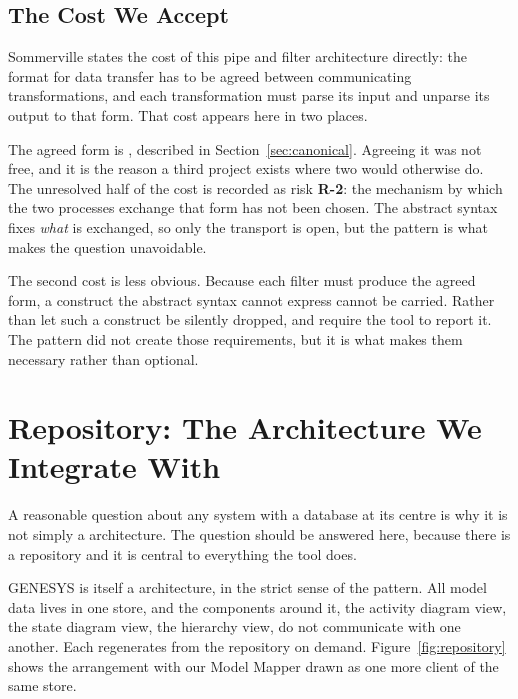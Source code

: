 \subsection{The Cost We Accept}

Sommerville states the cost of this pipe and filter architecture directly: the format for data
transfer has to be agreed between communicating transformations, and each
transformation must parse its input and unparse its output to that form. That
cost appears here in two places.

The agreed form is , described in
Section~\ref{sec:canonical}. Agreeing it was not free, and it is the reason a
third project exists where two would otherwise do. The unresolved half of the
cost is recorded as risk \textbf{R-2}: the mechanism by which the two processes
exchange that form has not been chosen. The abstract syntax fixes \emph{what} is
exchanged, so only the transport is open, but the pattern is what makes the
question unavoidable.

The second cost is less obvious. Because each filter must produce the agreed
form, a construct the abstract syntax cannot express cannot be carried. Rather
than let such a construct be silently dropped,  and  require
the tool to report it. The pattern did not create those requirements, but it is
what makes them necessary rather than optional.

\section{Repository: The Architecture We Integrate With}
\label{sec:repository}


A reasonable question about any system with a database at its centre is why it is not
simply a  architecture. The question should be answered
here, because there is a repository and it is central to everything the tool
does.

GENESYS is itself a  architecture, in the strict sense of
the pattern. All model data lives in one store, and the components around it,
the activity diagram view, the state diagram view, the hierarchy view, do not
communicate with one another. Each regenerates from the repository on demand.
Figure~\ref{fig:repository} shows the arrangement with our Model Mapper drawn as
one more client of the same store.

